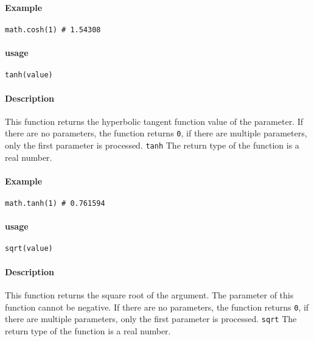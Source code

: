 \paragraph{Example}
\begin{lstlisting}[language=berry, numbers=none]
math.cosh(1) # 1.54308
\end{lstlisting}


\paragraph{usage}
\begin{lstlisting}[language=berry, numbers=none]
tanh(value)
\end{lstlisting}

\paragraph{Description}
This function returns the hyperbolic tangent function value of the parameter. If there are no parameters, the function returns \texttt{0}, if there are multiple parameters, only the first parameter is processed. \texttt{tanh} The return type of the function is a real number.

\paragraph{Example}
\begin{lstlisting}[language=berry, numbers=none]
math.tanh(1) # 0.761594
\end{lstlisting}


\paragraph{usage}
\begin{lstlisting}[language=berry, numbers=none]
sqrt(value)
\end{lstlisting}

\paragraph{Description}
This function returns the square root of the argument. The parameter of this function cannot be negative. If there are no parameters, the function returns \texttt{0}, if there are multiple parameters, only the first parameter is processed. \texttt{sqrt} The return type of the function is a real number.

